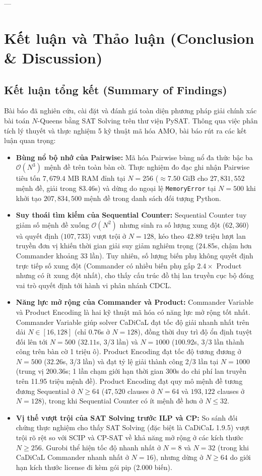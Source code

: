 \documentclass[a4paper,fleqn]{cas-sc}
\begin{document}
---

\section{Kết luận và Thảo luận (Conclusion \& Discussion)}

\subsection{Kết luận tổng kết (Summary of Findings)}
Bài báo đã nghiên cứu, cài đặt và đánh giá toàn diện phương pháp giải chính xác bài toán $N$-Queens bằng SAT Solving trên thư viện PySAT. Thông qua việc phân tích lý thuyết và thực nghiệm 5 kỹ thuật mã hóa AMO, bài báo rút ra các kết luận quan trọng:
\begin{itemize}
    \item \textbf{Bùng nổ bộ nhớ của Pairwise:} Mã hóa Pairwise bùng nổ đa thức bậc ba $\mathcal{O}(N^3)$ mệnh đề trên toàn bàn cờ. Thực nghiệm đo đạc ghi nhận Pairwise tiêu tốn $7{,}679.4$ MB RAM đỉnh tại $N=256$ ($\approx 7.50$ GiB cho $27{,}831{,}552$ mệnh đề, giải trong $83.46$s) và dừng do ngoại lệ \texttt{MemoryError} tại $N=500$ khi khởi tạo $207{,}834{,}500$ mệnh đề trong danh sách đối tượng Python.
    \item \textbf{Suy thoái tìm kiếm của Sequential Counter:} Sequential Counter tuy giảm số mệnh đề xuống $\mathcal{O}(N^2)$ nhưng sinh ra số lượng xung đột ($62{,}360$) và quyết định ($107{,}733$) vượt trội ở $N=128$, kéo theo $42.89$ triệu lượt lan truyền đơn vị khiến thời gian giải suy giảm nghiêm trọng ($24.85$s, chậm hơn Commander khoảng 33 lần). Tuy nhiên, số lượng biến phụ không quyết định trực tiếp số xung đột (Commander có nhiều biến phụ gấp $2.4\times$ Product nhưng có ít xung đột nhất), cho thấy cấu trúc đồ thị lan truyền cục bộ đóng vai trò quyết định tới hành vi phân nhánh CDCL.
    \item \textbf{Năng lực mở rộng của Commander và Product:} Commander Variable và Product Encoding là hai kỹ thuật mã hóa có năng lực mở rộng tốt nhất. Commander Variable giúp solver CaDiCaL đạt tốc độ giải nhanh nhất trên dải $N \in [16, 128]$ (chỉ $0.76$s ở $N=128$), đồng thời duy trì độ ổn định tuyệt đối lên tới $N=500$ ($32.11$s, 3/3 lần) và $N=1000$ ($100.92$s, 3/3 lần thành công trên bàn cờ 1 triệu ô). Product Encoding đạt tốc độ tương đương ở $N=500$ ($32.26$s, 3/3 lần) và đạt tỷ lệ giải thành công 2/3 lần tại $N=1000$ (trung vị $200.36$s; 1 lần chạm giới hạn thời gian 300s do chi phí lan truyền trên 11.95 triệu mệnh đề). Product Encoding đạt quy mô mệnh đề tương đương Sequential ở $N \ge 64$ ($47{,}520$ clauses ở $N=64$ và $193{,}122$ clauses ở $N=128$), trong khi Sequential Counter có ít mệnh đề hơn ở $N \le 32$.
    \item \textbf{Vị thế vượt trội của SAT Solving trước ILP và CP:} So sánh đối chứng thực nghiệm cho thấy SAT Solving (đặc biệt là CaDiCaL 1.9.5) vượt trội rõ rệt so với SCIP và CP-SAT về khả năng mở rộng ở các kích thước $N \ge 256$. Gurobi thể hiện tốc độ nhanh nhất ở $N = 8$ và $N = 32$ (trong khi CaDiCaL Commander nhanh nhất ở $N = 16$), nhưng dừng ở $N \ge 64$ do giới hạn kích thước license đi kèm gói pip (2.000 biến).
\end{itemize}
\end{document}
